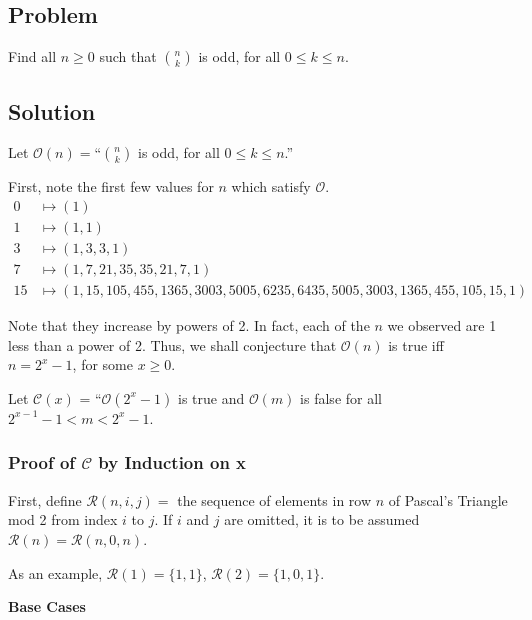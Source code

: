 \documentclass{article}
\newcommand{\pred}{\mathcal{O}}
\newcommand{\conject}{\mathcal{C}}
\newcommand{\modrow}{\mathcal{R}}
\begin{document}
\begin{center}\item \section*{Problem}\end{center}

Find all $n \geq 0$ such that ${n \choose k}$ is odd, for all $0\leq k \leq n$.

\begin{center}\item \section*{Solution}\end{center}

Let $\pred(n) = $``${n \choose k}$ is odd, for all $0 \leq k \leq n$.''

First, note the first few values for $n$ which satisfy $\pred$.
\begin{align*}
  0 &\mapsto (1)\\
  1 &\mapsto (1,1)\\
  3 &\mapsto (1,3,3,1)\\
  7 &\mapsto (1,7,21,35,35,21,7,1)\\
  15 &\mapsto (1,15,105,455,1365,3003,5005,6235,6435,5005,3003,1365,455,105,15,1)
\end{align*}


Note that they increase by powers of 2. In fact, each of the $n$ we observed are 1 less than a power of 2. Thus, we shall conjecture that $\pred(n)$ is true iff $n = 2^x-1$, for some $x \geq 0$.

Let $\conject(x)$ = ``$\pred(2^x-1)$ is true and $\pred(m)$ is false for all $2^{x-1}-1 < m < 2^x-1$.


\begin{center}\item \subsubsection*{Proof of $\conject$ by Induction on x}\end{center}

First, define $\modrow(n,i,j) = $ the sequence of elements in row $n$ of Pascal's Triangle mod 2 from index $i$ to $j$. If $i$ and $j$ are omitted, it is to be assumed $\modrow(n) = \modrow(n, 0, n)$.

As an example, $\modrow(1) = \{1,1\}$, $\modrow(2)= \{1,0,1\}$.
\begin{center}\item \textbf{Base Cases} \end{center}
\end{document}

